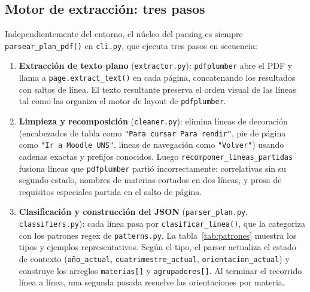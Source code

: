\documentclass[12pt, a4paper]{report}
\begin{document}
\subsection{Motor de extracción: tres pasos}

Independientemente del entorno, el núcleo del parsing es siempre
\texttt{parsear\_plan\_pdf()} en \texttt{cli.py}, que ejecuta tres pasos en
secuencia:

\begin{enumerate}
  \item \textbf{Extracción de texto plano} (\texttt{extractor.py}):
        \texttt{pdfplumber} abre el PDF y llama a \texttt{page.extract\_text()}
        en cada página, concatenando los resultados con saltos de línea. El texto
        resultante preserva el orden visual de las líneas tal como las organiza el
        motor de layout de \texttt{pdfplumber}.

  \item \textbf{Limpieza y recomposición} (\texttt{cleaner.py}): elimina líneas
        de decoración (encabezados de tabla como \texttt{"Para cursar Para rendir"},
        pie de página como \texttt{"Ir a Moodle UNS"}, líneas de navegación como
        \texttt{"Volver"}) usando cadenas exactas y prefijos conocidos. Luego
        \texttt{recomponer\_lineas\_partidas} fusiona líneas que \texttt{pdfplumber}
        partió incorrectamente: correlativas sin su segundo estado, nombres de
        materias cortados en dos líneas, y prosa de requisitos especiales partida
        en el salto de página.

  \item \textbf{Clasificación y construcción del JSON}
        (\texttt{parser\_plan.py}, \texttt{classifiers.py}): cada línea pasa por
        \texttt{clasificar\_linea()}, que la categoriza con los patrones regex de
        \texttt{patterns.py}. La tabla~\ref{tab:patrones} muestra los tipos y
        ejemplos representativos. Según el tipo, el parser actualiza el estado de
        contexto (\texttt{año\_actual}, \texttt{cuatrimestre\_actual},
        \texttt{orientacion\_actual}) y construye los arreglos \texttt{materias[]}
        y \texttt{agrupadores[]}. Al terminar el recorrido línea a línea, una
        segunda pasada resuelve las orientaciones por materia.
\end{enumerate}
\end{document}
